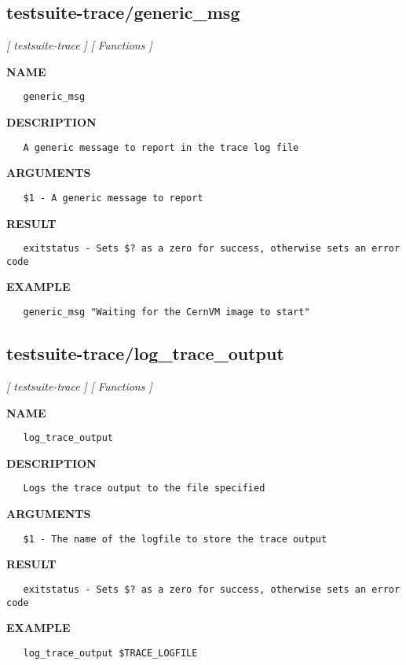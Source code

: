 \subsection{testsuite-trace/generic\_msg}
\textsl{[ testsuite-trace ]}
\textsl{[ Functions ]}

\label{ch:robo46}
\label{ch:testsuite_trace_generic_msg}
\textbf{NAME}
\begin{verbatim}
   generic_msg
\end{verbatim}
\textbf{DESCRIPTION}
\begin{verbatim}
   A generic message to report in the trace log file
\end{verbatim}
\textbf{ARGUMENTS}
\begin{verbatim}
   $1 - A generic message to report
\end{verbatim}
\textbf{RESULT}
\begin{verbatim}
   exitstatus - Sets $? as a zero for success, otherwise sets an error code
\end{verbatim}
\textbf{EXAMPLE}
\begin{verbatim}
   generic_msg "Waiting for the CernVM image to start"
\end{verbatim}
\newpage
\subsection{testsuite-trace/log\_trace\_output}
\textsl{[ testsuite-trace ]}
\textsl{[ Functions ]}

\label{ch:robo47}
\label{ch:testsuite_trace_log_trace_output}
\textbf{NAME}
\begin{verbatim}
   log_trace_output
\end{verbatim}
\textbf{DESCRIPTION}
\begin{verbatim}
   Logs the trace output to the file specified
\end{verbatim}
\textbf{ARGUMENTS}
\begin{verbatim}
   $1 - The name of the logfile to store the trace output
\end{verbatim}
\textbf{RESULT}
\begin{verbatim}
   exitstatus - Sets $? as a zero for success, otherwise sets an error code
\end{verbatim}
\textbf{EXAMPLE}
\begin{verbatim}
   log_trace_output $TRACE_LOGFILE
\end{verbatim}
\newpage
